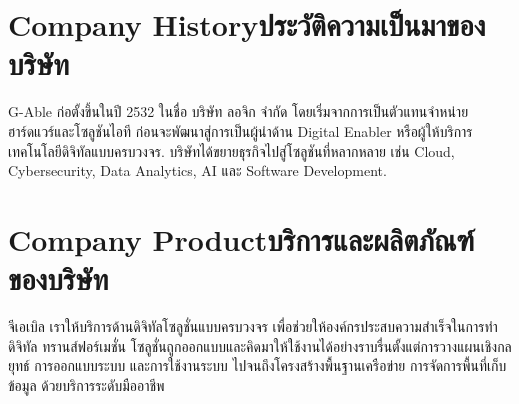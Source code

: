 \section{\ifenglish Company History\else ประวัติความเป็นมาของบริษัท\fi}

G-Able \cite{gableWebsite} ก่อตั้งขึ้นในปี 2532 ในชื่อ บริษัท ลอจิก จำกัด โดยเริ่มจากการเป็นตัวแทนจำหน่ายฮาร์ดแวร์และโซลูชันไอที ก่อนจะพัฒนาสู่การเป็นผู้นำด้าน Digital Enabler หรือผู้ให้บริการเทคโนโลยีดิจิทัลแบบครบวงจร. บริษัทได้ขยายธุรกิจไปสู่โซลูชันที่หลากหลาย เช่น Cloud, Cybersecurity, Data Analytics, AI และ Software Development. 

\section{\ifenglish Company Product\else บริการและผลิตภัณฑ์ของบริษัท\fi}
จีเอเบิล เราให้บริการด้านดิจิทัลโซลูชั่นแบบครบวงจร เพื่อช่วยให้องค์กรประสบความสำเร็จในการทำ ดิจิทัล ทรานส์ฟอร์เมชั่น
โซลูชั่นถูกออกแบบและคิดมาให้ใช้งานได้อย่างราบรื่นตั้งแต่การวางแผนเชิงกลยุทธ์ การออกแบบระบบ และการใช้งานระบบ ไปจนถึงโครงสร้างพื้นฐานเครือข่าย การจัดการพื้นที่เก็บข้อมูล ด้วยบริการระดับมืออาชีพ

